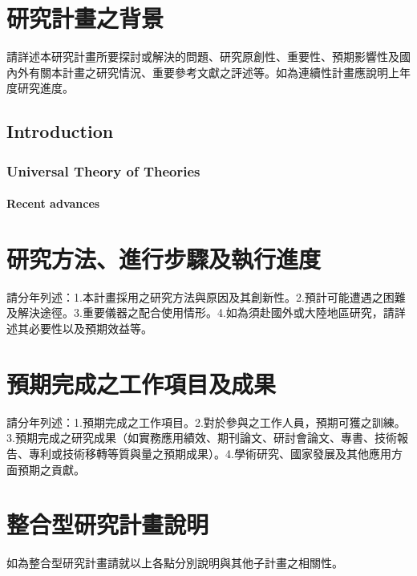 
\section{研究計畫之背景}
請詳述本研究計畫所要探討或解決的問題、研究原創性、重要性、預期影響性及國內外有關本計畫之研究情況、重要參考文獻之評述等。如為連續性計畫應說明上年度研究進度。

\subsection{Introduction}

\blindtext

\subsubsection{Universal Theory of Theories}

\blindtext

\paragraph{Recent advances}

\blindtext

\section{研究方法、進行步驟及執行進度}
請分年列述：1.本計畫採用之研究方法與原因及其創新性。2.預計可能遭遇之困難及解決途徑。3.重要儀器之配合使用情形。4.如為須赴國外或大陸地區研究，請詳述其必要性以及預期效益等。

\section{預期完成之工作項目及成果}
請分年列述：1.預期完成之工作項目。2.對於參與之工作人員，預期可獲之訓練。3.預期完成之研究成果（如實務應用績效、期刊論文、研討會論文、專書、技術報告、專利或技術移轉等質與量之預期成果）。4.學術研究、國家發展及其他應用方面預期之貢獻。

\section{整合型研究計畫說明}
如為整合型研究計畫請就以上各點分別說明與其他子計畫之相關性。

\nocite{greenwade93,knuth86}





